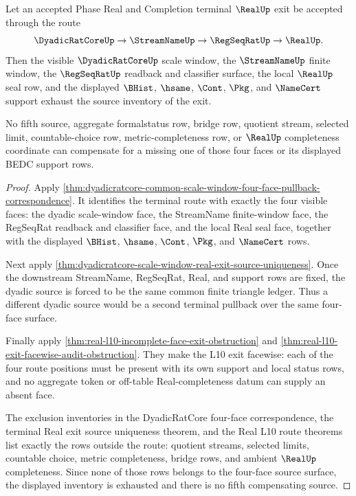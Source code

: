 \begin{theorem}
\label{thm:dyadicratcore-terminal-real-exit-no-fifth-source}
Let an accepted Phase Real and Completion terminal $\RealUp$ exit be accepted through the route
$$
\DyadicRatCoreUp \to \StreamNameUp \to \RegSeqRatUp \to \RealUp .
$$
Then the visible $\DyadicRatCoreUp$ scale window, the $\StreamNameUp$ finite window, the $\RegSeqRatUp$ readback and classifier surface, the local $\RealUp$ seal row, and the displayed $\BHist$, $\hsame$, $\Cont$, $\Pkg$, and $\NameCert$ support exhaust the source inventory of the exit.

No fifth source, aggregate formalstatus row, bridge row, quotient stream, selected limit, countable-choice row, metric-completeness row, or $\RealUp$ completeness coordinate can compensate for a missing one of those four faces or its displayed BEDC support rows.
\end{theorem}
\begin{proof}
Apply \autoref{thm:dyadicratcore-common-scale-window-four-face-pullback-correspondence}. It identifies the terminal route with exactly the four visible faces: the dyadic scale-window face, the StreamName finite-window face, the RegSeqRat readback and classifier face, and the local Real seal face, together with the displayed $\BHist$, $\hsame$, $\Cont$, $\Pkg$, and $\NameCert$ rows.

Next apply \autoref{thm:dyadicratcore-scale-window-real-exit-source-uniqueness}. Once the downstream StreamName, RegSeqRat, Real, and support rows are fixed, the dyadic source is forced to be the same common finite triangle ledger. Thus a different dyadic source would be a second terminal pullback over the same four-face surface.

Finally apply \autoref{thm:real-l10-incomplete-face-exit-obstruction} and \autoref{thm:real-l10-exit-facewise-audit-obstruction}. They make the L10 exit facewise: each of the four route positions must be present with its own support and local status rows, and no aggregate token or off-table Real-completeness datum can supply an absent face.

The exclusion inventories in the DyadicRatCore four-face correspondence, the terminal Real exit source uniqueness theorem, and the Real L10 route theorems list exactly the rows outside the route: quotient streams, selected limits, countable choice, metric completeness, bridge rows, and ambient $\RealUp$ completeness. Since none of those rows belongs to the four-face source surface, the displayed inventory is exhausted and there is no fifth compensating source.
\end{proof}

